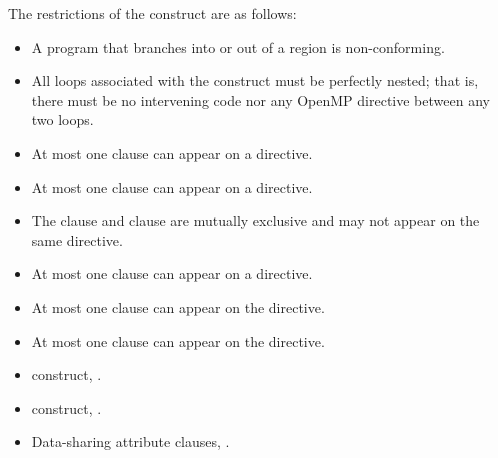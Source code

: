 \restrictions
The restrictions of the  construct are as follows:
\begin{itemize}
\item A program that branches into or out of a  region is non-conforming.
\item All loops associated with the  construct must be perfectly nested; that is, there must be no intervening code nor any OpenMP directive between any two loops.
\item At most one  clause can appear on a  directive.
\item At most one  clause can appear on a  directive.
\item The  clause and  clause are mutually exclusive and may not appear on the same  directive.
\item At most one  clause can appear on a  directive.
\item At most one  clause can appear on the directive.
\item At most one  clause can appear on the directive. 
\end{itemize}

\crossreferences
\begin{itemize}
\item {} construct, .
\item {} construct, .
\item Data-sharing attribute clauses, . 
\end{itemize}






%
%

